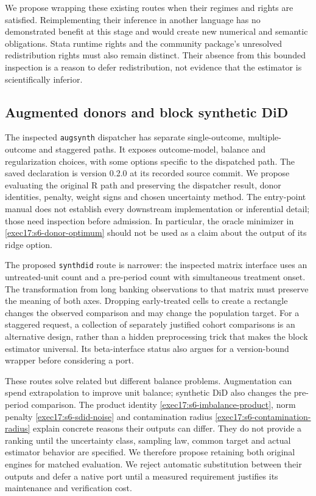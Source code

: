We propose wrapping these existing routes when their regimes and
rights are satisfied. Reimplementing their inference in another
language has no demonstrated benefit at this stage and would create
new numerical and semantic obligations. Stata runtime rights and
the community package's unresolved redistribution rights must also
remain distinct. Their absence from this bounded inspection is a
reason to defer redistribution, not evidence that the estimator is
scientifically inferior.

\subsection{Augmented donors and block synthetic DiD}

The inspected \texttt{augsynth} dispatcher has separate single-outcome,
multiple-outcome and staggered paths. It exposes outcome-model,
balance and regularization choices, with some options specific to
the dispatched path. The saved declaration is version 0.2.0 at its
recorded source commit. We propose evaluating the original R path
and preserving the dispatcher result, donor identities, penalty,
weight signs and chosen uncertainty method. The entry-point manual
does not establish every downstream implementation or inferential
detail; those need inspection before admission. In particular, the
oracle minimizer in \eqref{exec17:s6-donor-optimum} should not be
used as a claim about the output of its ridge option.
\citep{v12_sw_augsynth,exec17_s6_paths}

The proposed \texttt{synthdid} route is narrower: the inspected
matrix interface uses an untreated-unit count and a pre-period
count with simultaneous treatment onset. The transformation from
long banking observations to that matrix must preserve the meaning
of both axes. Dropping early-treated cells to create a rectangle
changes the observed comparison and may change the population
target. For a staggered request, a collection of separately justified
cohort comparisons is an alternative design, rather than a hidden
preprocessing trick that makes the block estimator universal.
Its beta-interface status also argues for a version-bound wrapper
before considering a port.~\citep{sw_synthdid}

These routes solve related but different balance problems. Augmentation
can spend extrapolation to improve unit balance; synthetic DiD also
changes the pre-period comparison. The product identity
\eqref{exec17:s6-imbalance-product}, norm penalty
\eqref{exec17:s6-sdid-noise} and contamination radius
\eqref{exec17:s6-contamination-radius} explain concrete reasons their
outputs can differ. They do not provide a ranking until the uncertainty
class, sampling law, common target and actual estimator behavior are
specified. We therefore propose retaining both original engines for
matched evaluation. We reject automatic substitution between their
outputs and defer a native port until a measured requirement justifies
its maintenance and verification cost.

